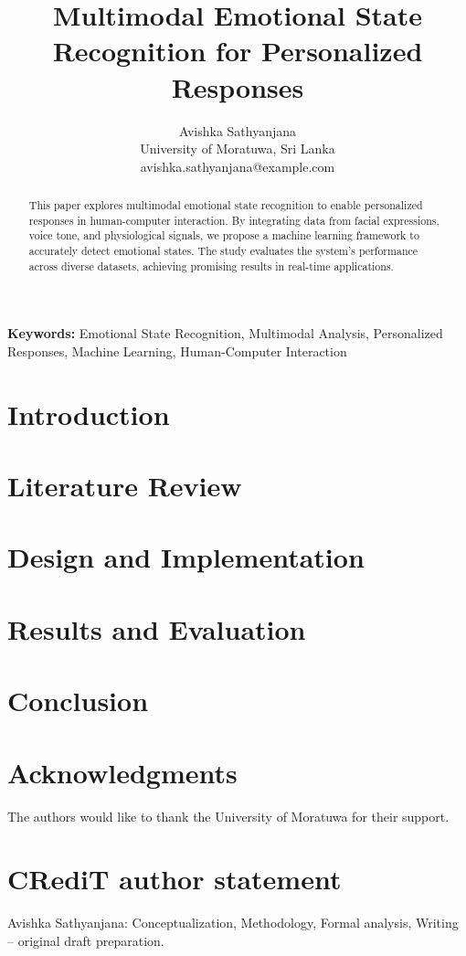 \documentclass[10pt,a4paper]{article}
\title{\textbf{\fontsize{14}{16}\selectfont Multimodal Emotional State Recognition for Personalized Responses}}
\author{
    \fontsize{10}{12}\selectfont Avishka Sathyanjana \\
    \fontsize{9}{11}\selectfont University of Moratuwa, Sri Lanka \\
    \fontsize{9}{11}\selectfont avishka.sathyanjana@example.com
}
\begin{document}
\maketitle

\begin{abstract}
    \fontsize{9}{11}\selectfont
    This paper explores multimodal emotional state recognition to enable personalized responses in human-computer interaction. By integrating data from facial expressions, voice tone, and physiological signals, we propose a machine learning framework to accurately detect emotional states. The study evaluates the system's performance across diverse datasets, achieving promising results in real-time applications. %
\end{abstract}

\textbf{Keywords:} Emotional State Recognition, Multimodal Analysis, Personalized Responses, Machine Learning, Human-Computer Interaction

\section{Introduction}


\section{Literature Review}


\section{Design and Implementation}


\section{Results and Evaluation}


\section{Conclusion}


\section*{Acknowledgments}
The authors would like to thank the University of Moratuwa for their support.

\section*{CRediT author statement}
Avishka Sathyanjana: Conceptualization, Methodology, Formal analysis, Writing – original draft preparation.

\newpage

\end{document}
